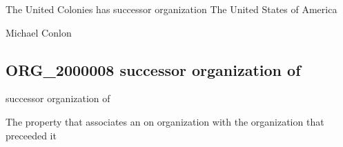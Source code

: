 \documentclass[letterpaper,10pt,english]{sphinxmanual}
\begin{document}
\begin{sphinxShadowBox}

\sphinxAtStartPar
The United Colonies has successor organization The United States of America
\end{sphinxShadowBox}

\begin{sphinxShadowBox}

\sphinxAtStartPar
{}
\end{sphinxShadowBox}

\begin{sphinxShadowBox}

\sphinxAtStartPar
Michael Conlon 
\end{sphinxShadowBox}
\begin{quote}

\ignorespaces \end{quote}


\subsection{ORG\_2000008 \sphinxhyphen{} successor organization of}
\label{\detokenize{doc-ORG_2000008:org-2000008-successor-organization-of}}\label{\detokenize{doc-ORG_2000008:index-0}}\label{\detokenize{doc-ORG_2000008::doc}}
\begin{sphinxShadowBox}

\sphinxAtStartPar
successor organization of
\end{sphinxShadowBox}

\begin{sphinxShadowBox}

\sphinxAtStartPar
{}
\end{sphinxShadowBox}

\begin{sphinxShadowBox}

\sphinxAtStartPar
The property that associates an on organization with the organization that preceeded it
\end{sphinxShadowBox}
\end{document}
